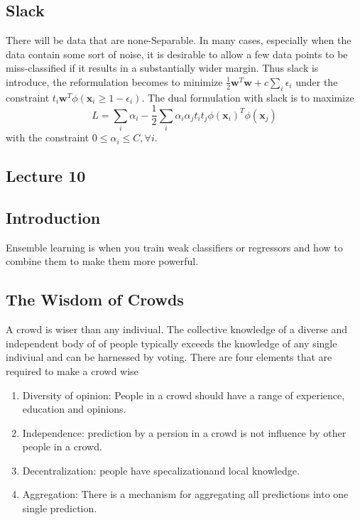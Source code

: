 \documentclass[12pt]{article}
\numberwithin{equation}{section}
\begin{document}
\subsection{Slack}
There will be data that are none-Separable. In many cases, especially when the data contain some sort of noise, it is desirable to allow a few data points to be miss-classified if it results in a substantially wider margin. Thus slack is introduce, the reformulation becomes to minimize $\frac{1}{2} \bm{w}^T \bm{w} + c \sum_i \epsilon_i$ under the constraint $t_i \bm{w}^T \phi (\bm{x}_i \geq 1 - \epsilon_i)$. The dual formulation with slack is to maximize
\begin{equation}
    L = \sum_i \alpha_i - \frac{1}{2} \sum_i \alpha_i \alpha_j t_i t_j \phi (\bm{x}_i)^T \phi (\bm{x}_j)
\end{equation}
with the constraint $ 0 \leq \alpha_i \leq C, \forall i$.

\subsection{Lecture 10}

\subsection{Introduction}

Ensemble learning is when you train weak classifiers or regressors and how to combine them to make them more powerful.

\subsection{The Wisdom of Crowds}
A crowd is wiser than any indiviual. The collective knowledge of a diverse and independent body of of people typically exceeds the knowledge of any single indiviual and can be harnessed by voting. There are four elements that are required to make a crowd wise
\begin{enumerate}
\item
Diversity of opinion: People in a crowd should have a range of experience, education and opinions.
\item
Independence: prediction by a persion in a crowd is not influence by other people in a crowd.
\item 
Decentralization: people have specalizationand local knowledge.
\item
Aggregation: There is a mechanism for aggregating all predictions into one single prediction.
\end{enumerate}
\end{document}
